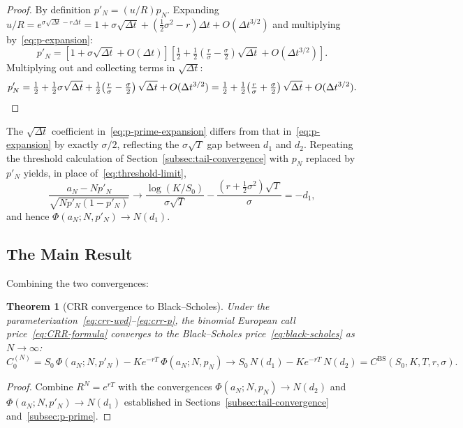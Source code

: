 \documentclass[11pt,a4paper]{article}
\theoremstyle{plain}
\newtheorem{theorem}{Theorem}[section]
\theoremstyle{definition}
\begin{document}
\begin{proof}
By definition $p'_N = (u/R) p_N$. Expanding $u/R = e^{\sigma\sqrt{\Delta t} - r\Delta t}
= 1 + \sigma\sqrt{\Delta t} + (\tfrac{1}{2}\sigma^2 - r)\Delta t
+ O(\Delta t^{3/2})$ and multiplying by~\eqref{eq:p-expansion}:
\[
p'_N = \left[1 + \sigma\sqrt{\Delta t} + O(\Delta t)\right]
       \left[\tfrac{1}{2} + \tfrac{1}{2}\!\left(\tfrac{r}{\sigma} - \tfrac{\sigma}{2}\right)
             \sqrt{\Delta t} + O(\Delta t^{3/2})\right].
\]
Multiplying out and collecting terms in $\sqrt{\Delta t}$:
\[
p'_N = \tfrac{1}{2} + \tfrac{1}{2}\sigma\sqrt{\Delta t}
       + \tfrac{1}{2}\!\left(\tfrac{r}{\sigma} - \tfrac{\sigma}{2}\right)\sqrt{\Delta t}
       + O(\Delta t^{3/2})
     = \tfrac{1}{2} + \tfrac{1}{2}\!\left(\tfrac{r}{\sigma} + \tfrac{\sigma}{2}\right)
       \sqrt{\Delta t} + O(\Delta t^{3/2}). \qedhere
\]
\end{proof}

The $\sqrt{\Delta t}$ coefficient in~\eqref{eq:p-prime-expansion} differs
from that in~\eqref{eq:p-expansion} by exactly $\sigma/2$, reflecting the
$\sigma\sqrt{T}$ gap between $d_1$ and $d_2$. Repeating the threshold
calculation of Section~\ref{subsec:tail-convergence} with $p_N$ replaced
by $p'_N$ yields, in place of~\eqref{eq:threshold-limit},
\[
\frac{a_N - N p'_N}{\sqrt{N p'_N(1-p'_N)}}
\to \frac{\log(K/S_0)}{\sigma\sqrt{T}}
   - \frac{(r + \tfrac{1}{2}\sigma^2)\sqrt{T}}{\sigma}
= -d_1,
\]
and hence $\Phi(a_N; N, p'_N) \to N(d_1)$.

\subsection{The Main Result}
\label{subsec:main-convergence}

Combining the two convergences:

\begin{theorem}[CRR convergence to Black--Scholes]
\label{thm:CRR-to-BS}
Under the parameterization~\eqref{eq:crr-uvd}--\eqref{eq:crr-p}, the
binomial European call price~\eqref{eq:CRR-formula} converges to the
Black--Scholes price~\eqref{eq:black-scholes} as $N \to \infty$:
\[
C_0^{(N)} = S_0\, \Phi(a_N; N, p'_N) - K e^{-rT}\, \Phi(a_N; N, p_N)
\longrightarrow
S_0\, N(d_1) - K e^{-rT}\, N(d_2)
= C^{\mathrm{BS}}(S_0, K, T, r, \sigma).
\]
\end{theorem}

\begin{proof}
Combine $R^N = e^{rT}$ with the convergences
$\Phi(a_N; N, p_N) \to N(d_2)$ and $\Phi(a_N; N, p'_N) \to N(d_1)$
established in Sections~\ref{subsec:tail-convergence}
and~\ref{subsec:p-prime}.
\end{proof}
\end{document}
